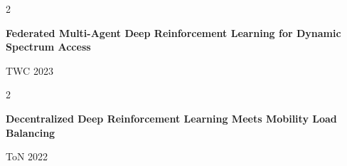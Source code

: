 \documentclass[10pt, letterpaper]{article}
\newenvironment{twocolentryPub}[2][]{
    \onecolentry
    \def\secondColumn{#2}
    \setcolumnwidth{\fill, 2.4 cm}
    \begin{paracol}{2}
}{
    \switchcolumn \raggedleft \secondColumn
    \end{paracol}
    \endonecolentry
} %
\begin{document}
\begin{samepage}
            \vspace{0.05 cm}






            \begin{twocolentryPub}{
                {\footnotesize TWC 2023}
            }
                {\footnotesize \textbf{Federated Multi-Agent Deep Reinforcement Learning for Dynamic Spectrum Access}}
            \end{twocolentryPub}

            \vspace{0.05 cm}


            \begin{twocolentryPub}{
                {\footnotesize ToN 2022}
            }
                {\footnotesize \textbf{Decentralized Deep Reinforcement Learning Meets Mobility Load Balancing}}
            \end{twocolentryPub}

            \vspace{0.05 cm}








        \end{samepage}
\end{document}
